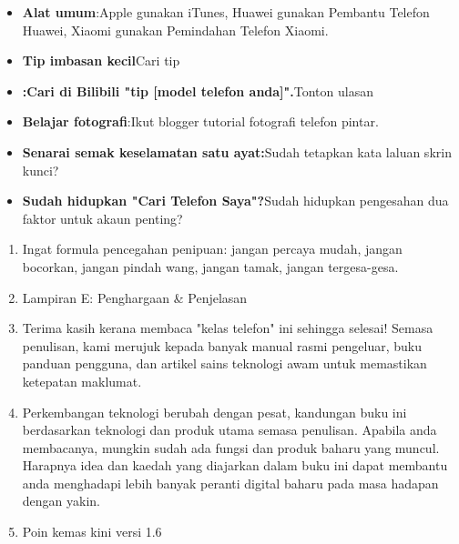 

\begin{itemize}
  \item \textbf{Alat umum}:Apple gunakan iTunes, Huawei gunakan Pembantu Telefon Huawei, Xiaomi gunakan Pemindahan Telefon Xiaomi.
  \item \textbf{Tip imbasan kecil}Cari tip
  \item \textbf{:Cari di Bilibili "tip [model telefon anda]".}Tonton ulasan
\end{itemize}


\begin{itemize}
  \item \textbf{Belajar fotografi}:Ikut blogger tutorial fotografi telefon pintar.
  \item \textbf{Senarai semak keselamatan satu ayat:}Sudah tetapkan kata laluan skrin kunci?
  \item \textbf{Sudah hidupkan "Cari Telefon Saya"?}Sudah hidupkan pengesahan dua faktor untuk akaun penting?
\end{itemize}


\begin{enumerate}
  \item Ingat formula pencegahan penipuan: jangan percaya mudah, jangan bocorkan, jangan pindah wang, jangan tamak, jangan tergesa-gesa.
  \item Lampiran E: Penghargaan \& Penjelasan
  \item Terima kasih kerana membaca "kelas telefon" ini sehingga selesai! Semasa penulisan, kami merujuk kepada banyak manual rasmi pengeluar, buku panduan pengguna, dan artikel sains teknologi awam untuk memastikan ketepatan maklumat.
  \item Perkembangan teknologi berubah dengan pesat, kandungan buku ini berdasarkan teknologi dan produk utama semasa penulisan. Apabila anda membacanya, mungkin sudah ada fungsi dan produk baharu yang muncul. Harapnya idea dan kaedah yang diajarkan dalam buku ini dapat membantu anda menghadapi lebih banyak peranti digital baharu pada masa hadapan dengan yakin.
  \item Poin kemas kini versi 1.6
\end{enumerate}
